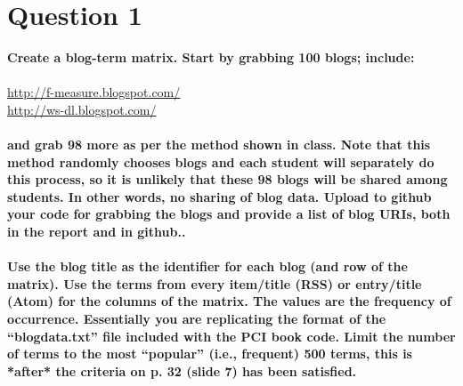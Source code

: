 \chapter{Question 1}
\label{intro}

\textbf{Create a blog-term matrix.  Start by grabbing 100 blogs; include:}\\ \\ 
\url{http://f-measure.blogspot.com/}\\
\url{http://ws-dl.blogspot.com/}\\\\
\textbf{and grab 98 more as per the method shown in class.  Note that this method randomly chooses blogs and each student will separately do this process, so it is unlikely that these 98 blogs will be shared among students.  In other words, no sharing of blog data.  Upload to github your code for grabbing the blogs and provide a list of blog URIs, both in the report and in github..\\\\
Use the blog title as the identifier for each blog (and row of the matrix).  Use the terms from every item/title (RSS) or entry/title (Atom) for the columns of the matrix.  The values are the frequency of occurrence.  Essentially you are replicating the format of the ``blogdata.txt'' file included with the PCI book code.  Limit the number of terms to the most ``popular'' (i.e., frequent) 500 terms, this is *after* the criteria on p. 32 (slide 7) has been satisfied.}\\\\

